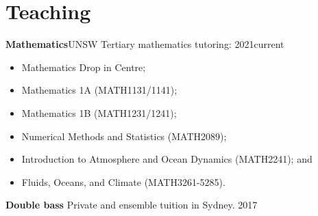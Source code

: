 
\section{Teaching}



\textbf{Mathematics}\hfill UNSW
\newline
Tertiary mathematics tutoring: \hfill 2021\textendash current
\begin{itemize}
    \item Mathematics Drop in Centre;
    \item Mathematics 1A (MATH1131/1141);
    \item Mathematics 1B (MATH1231/1241);
    \item Numerical Methods and Statistics (MATH2089);
    \item Introduction to Atmosphere and Ocean Dynamics (MATH2241); and
    \item Fluids, Oceans, and Climate (MATH3261-5285).
\end{itemize}

\textbf{Double bass}
\newline
Private and ensemble tuition in Sydney. \hfill 2017